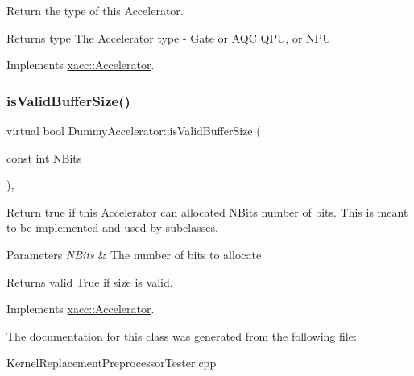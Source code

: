 Return the type of this Accelerator.

\begin{DoxyReturn}{Returns}
type The Accelerator type -\/ Gate or A\+QC Q\+PU, or N\+PU 
\end{DoxyReturn}


Implements \hyperlink{a01084_aaffc3e4bb9880eb5041b1b58ee4c2665}{xacc\+::\+Accelerator}.

\mbox{\label{a00976_a831ad0c71864920cc49a00d29768af8c}} 
\subsubsection{\texorpdfstring{is\+Valid\+Buffer\+Size()}{isValidBufferSize()}}
{\footnotesize\ttfamily virtual bool Dummy\+Accelerator\+::is\+Valid\+Buffer\+Size (\begin{DoxyParamCaption}\item[{const int}]{N\+Bits }\end{DoxyParamCaption})\hspace{0.3cm}{\ttfamily [inline]}, {\ttfamily [virtual]}}

Return true if this Accelerator can allocated N\+Bits number of bits. This is meant to be implemented and used by subclasses.


\begin{DoxyParams}{Parameters}
{\em N\+Bits} & The number of bits to allocate \\
\hline
\end{DoxyParams}
\begin{DoxyReturn}{Returns}
valid True if size is valid. 
\end{DoxyReturn}


Implements \hyperlink{a01084_ae51584850faeec77299058383977ddeb}{xacc\+::\+Accelerator}.



The documentation for this class was generated from the following file\+:\begin{DoxyCompactItemize}
\item 
Kernel\+Replacement\+Preprocessor\+Tester.\+cpp\end{DoxyCompactItemize}
